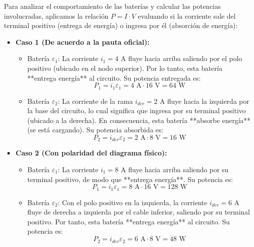 \documentclass{article}
\begin{document}
Para analizar el comportamiento de las baterías y calcular las potencias involucradas, aplicamos la relación $P = I \cdot V$ evaluando si la corriente sale del terminal positivo (entrega de energía) o ingresa por él (absorción de energía):
\begin{itemize}
    \item \textbf{Caso 1 (De acuerdo a la pauta oficial):}
    \begin{itemize}
        \item Batería $\varepsilon_1$: La corriente $i_1 = 4\text{ A}$ fluye hacia arriba saliendo por el polo positivo (ubicado en el nodo superior). Por lo tanto, esta batería **entrega energía** al circuito. Su potencia entregada es:
        \[
        P_1 = i_1 \varepsilon_1 = 4\text{ A} \cdot 16\text{ V} = \boxed{64\text{ W}}
        \]
        \item Batería $\varepsilon_2$: La corriente de la rama $i_{der} = 2\text{ A}$ fluye hacia la izquierda por la base del circuito, lo cual significa que ingresa por su terminal positivo (ubicado a la derecha). En consecuencia, esta batería **absorbe energía** (se está cargando). Su potencia absorbida es:
        \[
        P_2 = i_{der} \varepsilon_2 = 2\text{ A} \cdot 8\text{ V} = \boxed{16\text{ W}}
        \]
    \end{itemize}
    
    \item \textbf{Caso 2 (Con polaridad del diagrama físico):}
    \begin{itemize}
        \item Batería $\varepsilon_1$: La corriente $i_1 = 8\text{ A}$ fluye hacia arriba saliendo por su terminal positivo, de modo que **entrega energía**. Su potencia es:
        \[
        P_1 = i_1 \varepsilon_1 = 8\text{ A} \cdot 16\text{ V} = \boxed{128\text{ W}}
        \]
        \item Batería $\varepsilon_2$: Con el polo positivo en la izquierda, la corriente $i_{der} = 6\text{ A}$ fluye de derecha a izquierda por el cable inferior, saliendo por su terminal positivo. Por tanto, esta batería **entrega energía** al circuito. Su potencia es:
        \[
        P_2 = i_{der} \varepsilon_2 = 6\text{ A} \cdot 8\text{ V} = \boxed{48\text{ W}}
        \]
    \end{itemize}
\end{itemize}

\noindent{}
\end{document}
